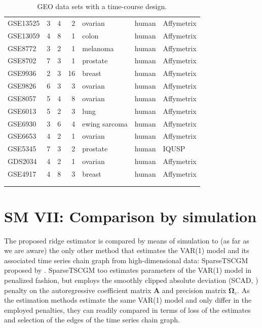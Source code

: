 \documentclass[a4paper]{article}
\begin{document}
\begin{table}
{\begin{tabular}{lrrrlll}
GSE13525	&	3	&	4	&	2	&	ovarian	&	human	&	Affymetrix	\\
GSE13059	&	4	&	8	&	1	&	colon	&	human	&	Affymetrix	\\
GSE8772	&	3	&	2	&	1	&	melanoma	&	human	&	Affymetrix	\\
GSE8702	&	7	&	3	&	1	&	prostate	&	human	&	Affymetrix	\\
GSE9936	&	2	&	3	&	16	&	breast	&	human	&	Affymetrix	\\
GSE9826	&	6	&	3	&	3	&	ovarian	&	human	&	Affymetrix	\\
GSE8057	&	5	&	4	&	8	&	ovarian	&	human	&	Affymetrix	\\
GSE6013	&	5	&	2	&	3	&	lung	&	human 	&	Affymetrix	\\
GSE6930	&	3	&	6	&	4	&	ewing sarcoma	&	human	&	Affymetrix	\\
GSE6653	&	4	&	2	&	1	&	ovarian	&	human	&	Affymetrix	\\
GSE5345	&	7	&	3	&	2	&	prostate	&	human	&	IQUSP	\\
GDS2034	&	4	&	2	&	1	&	ovarian 	&	human	&	Affymetrix	\\
GSE4917	&	4	&	8	&	3	&	breast	&	human 	&	Affymetrix	\\
& & & & & &
\\
\hline & & & & & & \\
\end{tabular}
}
\label{tableSM:GEOdatasets}
\caption{GEO data sets with a time-course design.}
\end{table}




\newpage
\section*{SM VII: Comparison by simulation}
The proposed ridge estimator is compared by means of simulation to (as far as we are aware) the only other method that estimates the VAR(1) model and its associated time series chain graph from high-dimensional data: SparseTSCGM proposed by \cite{Abeg2013}. SparseTSCGM too estimates parameters of the VAR(1) model in penalized fashion, but employs the smoothly clipped absolute deviation (SCAD, \citealp{Fan2001}) penalty on the autoregressive coefficient matrix $\mathbf{A}$ and precision matrix $\mathbf{\Omega}_{\varepsilon}$. As the estimation methods estimate the same VAR(1) model and only differ in the employed penalties, they can readily compared in terms of loss of the estimates and selection of the edges of the time series chain graph.
\end{document}
